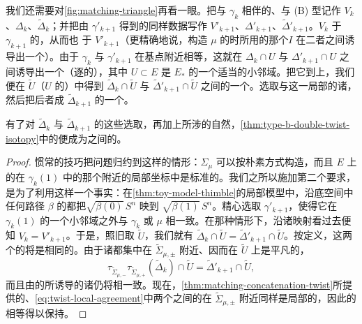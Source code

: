 我们还需要对\cref{fig:matching-triangle}再看一眼。把与 $\gamma_k$ 相伴的\trVanishingCycle、\trLefschetzThimble{}与 (B) 型\trLagrange\trSubmanifold{}记作 $V_k$、$\Delta_k$、$\widetilde{\Delta}_k$；并把由 $\gamma'_{k+1}$ 得到的同样数据写作 $V'_{k+1}$、$\Delta'_{k+1}$、$\widetilde{\Delta}'_{k+1}$。$V_k$ \trIsotopy{}于 $\gamma_{k+1}$ 的\trVanishingCycle，从而也 \trIsotopy{}于 $V'_{k+1}$（更精确地说，构造 $\mu$ 的\trMatchingCycle{}时所用的那个\trIsotopy{}$I$ 在二者之间诱导出一个\trIsotopy）。由于 $\gamma_k$ 与 $\gamma'_{k+1}$ 在基点附近相等，这就在 $\Delta_k\cap U$ 与 $\Delta'_{k+1}\cap U$ 之间诱导出一个（逐\trFiber{}的）\trIsotopy，其中 $U\subset E$ 是 $E_*$ 的一个适当的小邻域。把它\trLift{}到\trDoubleCover{}上，我们便在 $\widetilde{U}$（$U$ 的\trPreimage）中得到 $\widetilde{\Delta}_k\cap\widetilde{U}$ 与 $\widetilde{\Delta}'_{k+1}\cap\widetilde{U}$ 之间的一个\trIsotopy。选取与这一局部\trIsotopy{}\trCompatible{}的诸\trGrading，然后把后者\trDeformation{}成 $\widetilde{\Delta}_{k+1}$ 的一个\trGrading。
\begin{lemma}\label{thm:graded-twist-isotopy}
有了对 $\widetilde{\Delta}_k$ 与 $\widetilde{\Delta}_{k+1}$ 的这些\trGrading{}选取，再加上所涉\trDehnTwist{}的自然\trGrading，\cref{thm:type-b-double-twist-isotopy}中的\trIsotopy{}便成为\trGraded\trLagrange\trSubmanifold{}之间的\trIsotopy。
\end{lemma}
\begin{proof}
惯常的\trDeformation{}技巧把问题归约到这样的情形：\trMatchingCycle{}$\Sigma_\mu$ 可以按朴素方式构造，而且 $E$ 上的\trSymplecticForm{}在 $\gamma_k(1)$ 中的那个\trCriticalPoint{}附近的局部\trHolomorphic{}\trMorse{}坐标中是标准的。我们之所以施加第二个要求，是为了利用这样一个事实：在\cref{thm:toy-model-thimble}的局部模型中，沿底空间中任何路径 $\beta$ 的\trParallelTransport{}都把\trVanishingCycle{}$\sqrt{\beta(0)}\,S^n$ 映到 $\sqrt{\beta(1)}\,S^n$。精心选取 $\gamma'_{k+1}$，使得它在\trCriticalValue{}$\gamma_k(1)$ 的一个小邻域之外与 $\gamma_k$ 或 $\mu$ 相一致。在那种情形下，沿诸\trParallelTransport{}映射看过去便知 $V_k=V'_{k+1}$。于是，照旧取 $\widetilde{U}$，我们就有 $\widetilde{\Delta}_k\cap\widetilde{U}=\widetilde{\Delta}'_{k+1}\cap\widetilde{U}$。按定义，这两个\trSubmanifold{}的\trGrading{}将是相同的。由于诸\trDehnTwist{}都集中在 $\widetilde{\Sigma}_{\mu,\pm}$ 附近、因而在 $\widetilde{U}$ 上是平凡的，
\begin{equation}\label{eq:twist-local-agreement}
\tau_{\widetilde{\Sigma}_{\mu,-}}\tau_{\widetilde{\Sigma}_{\mu,+}}(\widetilde{\Delta}_k)\cap\widetilde{U}
=\widetilde{\Delta}'_{k+1}\cap\widetilde{U},
\end{equation}
而且由\trDehnTwist{}的\trCanonical\trGrading{}所诱导的诸\trGrading{}仍将相一致。现在，\cref{thm:matching-concatenation-twist}所提供的、\eqref{eq:twist-local-agreement}中两个\trLagrange\trSubmanifold{}之间的\trIsotopy{}在 $\widetilde{\Sigma}_{\mu,\pm}$ 附近同样是局部的，因此\trGrading{}的相等得以保持。
\end{proof}
